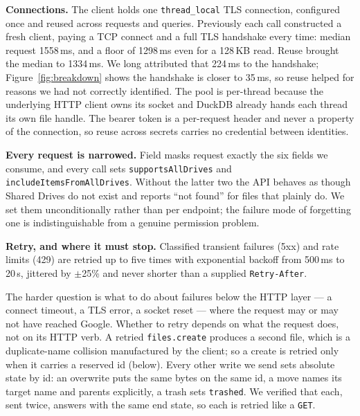 \documentclass[sigconf, nonacm]{acmart}
\begin{document}
\textbf{Connections.}
The client holds one \texttt{thread\_local} TLS connection, configured once and
reused across requests and queries. Previously each call constructed a fresh
client, paying a TCP connect and a full TLS handshake every time: median
request 1558\,ms, and a floor of 1298\,ms even for a 128\,KB read. Reuse
brought the median to 1334\,ms. We long attributed that 224\,ms to the
handshake; Figure~\ref{fig:breakdown} shows the handshake is closer to 35\,ms,
so reuse helped for reasons we had not correctly identified. The pool is
per-thread because the underlying HTTP client owns its socket and DuckDB
already hands each thread its own file handle. The bearer token is a
per-request header and never a property of the connection, so reuse across
secrets carries no credential between identities.

\textbf{Every request is narrowed.}
Field masks request exactly the six fields we consume, and every call sets
\texttt{supportsAllDrives} and \texttt{includeItemsFromAllDrives}. Without the
latter two the API behaves as though Shared Drives do not exist and reports
``not found'' for files that plainly do. We set them unconditionally rather
than per endpoint; the failure mode of forgetting one is indistinguishable
from a genuine permission problem.

\textbf{Retry, and where it must stop.}
Classified transient failures (5xx) and rate limits (429) are retried up to
five times with exponential backoff from 500\,ms to 20\,s, jittered by
$\pm$25\% and never shorter than a supplied \texttt{Retry-After}.

The harder question is what to do about failures below the HTTP layer --- a
connect timeout, a TLS error, a socket reset --- where the request may or may
not have reached Google. Whether to retry depends on what the request does,
not on its HTTP verb. A retried \texttt{files.create} produces a second file,
which is a duplicate-name collision manufactured by the client; so a create is
retried only when it carries a reserved id (below). Every other write we send
sets absolute state by id: an overwrite puts the same bytes on the same id, a
move names its target name and parents explicitly, a trash sets
\texttt{trashed}. We verified that each, sent twice, answers with the same end
state, so each is retried like a \texttt{GET}.
\end{document}
